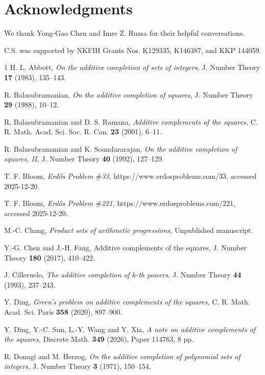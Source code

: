 \documentclass[12pt,a4paper,reqno]{amsart}
\numberwithin{equation}{section}
\theoremstyle{plain}
\theoremstyle{definition}
\begin{document}
\section*{Acknowledgments}
We thank Yong-Gao Chen and Imre Z. Ruzsa for their helpful conversations.

C.S. was supported by NKFIH Grants Nos. K129335, K146387, and KKP 144059.

\begin{thebibliography}{1}
H. L. Abbott, {\it On the additive completion of sets of integers,} J. Number Theory {\bf 17} (1983), 135--143.

R. Balasubramanian, {\it On the additive completion of squares,} J. Number Theory {\bf29} (1988), 10--12.

R. Balasubramanian and D. S. Ramana, {\it Additive complements of the squares,} C. R. Math. Acad. Sci. Soc. R. Can. {\bf23} (2001), 6--11.

R. Balasubramanian and K. Soundararajan, {\it On the additive completion of squares, II,} J. Number Theory {\bf40} (1992), 127--129.

T. F. Bloom, {\it Erd\H os Problem $\#$33,} https://www.erdosproblems.com/33, accessed 2025-12-20.

T. F. Bloom, {\it Erd\H os Problem $\#$221,} https://www.erdosproblems.com/221, accessed 2025-12-20.

M.-C. Chang, {\it Product sets of arithmetic progressions,} Unpublished manuscript. 

Y.-G. Chen and J.-H. Fang, Additive complements of the squares,  J. Number Theory {\bf 180} (2017), 410--422.

J. Cilleruelo, {\it The additive completion of $k$-th powers,} J. Number Theory {\bf44} (1993), 237--243.

Y. Ding, {\it Green’s problem on additive complements of the squares,} C. R. Math. Acad. Sci. Paris {\bf358} (2020), 897--900.

Y. Ding, Y.-C. Sun, L.-Y. Wang and Y. Xia, {\it A note on additive complements of the squares,} Discrete Math. {\bf349} (2026),  Paper 114763, 8 pp.

R. Donagi and M. Herzog, {\it On the additive completion of polynomial sets of integers,} J. Number Theory {\bf3} (1971), 150--154.


\end{thebibliography}
\end{document}
